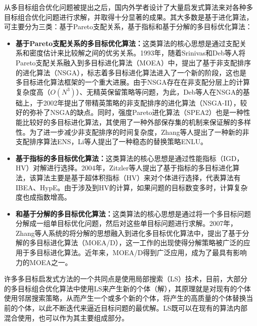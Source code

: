 从多目标组合优化问题被提出之后，国内外学者设计了大量启发式算法来对各种多目标组合优化问题进行求解，并取得十分显著的成果。其大多数是基于进化算法，可主要分为三类：基于Pareto支配关系，基于指标和基于分解的多目标优化算法：
\begin{itemize}
    \item \textbf{基于Pareto支配关系的多目标优化算法：}这类算法的核心思想是通过支配关系和密度估计来比较解之间的优劣关系。1993年，随着Srinivas和Deb等人将Pareto支配关系融入到多目标进化算法（MOEA）中，提出了基于非支配排序的进化算法（NSGA）\cite{srinivas1994muiltiobjective}，标志着多目标进化算法进入了一个新的阶段，这也是多目标进化算法框架的一个重大进展。由于NSGA存在在非支配分层上的计算复杂度高（$O(N^3)$）、无精英保留策略等问题，为此，Deb等人在NSGA的基础上，于2002年提出了带精英策略的非支配排序的进化算法（NSGA-II）\cite{deb2002fast}，较好的弥补了NSGA的缺点。同时，强度Pareto进化算法（SPEA2）\cite{zitzler2001spea2}也是一种性能比较好的多目标进化算法，其使用了一种外部保存集的机制来保证解的多样性。为了进一步减少非支配排序的时间复杂度，Zhang等人提出了一种新的非支配排序算法ENS\cite{zhang2014efficient}，Li等人提出了一种稳态的替换策略ENLU\cite{li2016efficient}。
    \item \textbf{基于指标的多目标优化算法：}这类算法的核心思想是通过性能指标（IGD\cite{bosman2003balance}，HV\cite{zitzler1999multiobjective}）对解进行选择。2004年，Zitzler等人提出了基于指标的多目标进化算法，该算法主要是基于超体积指标（HV）来对个体进行选择，代表算法有IBEA\cite{zitzler2004indicator}、HypE\cite{bader2011hype}。由于涉及到HV的计算，如果问题的目标数变多时，计算复杂度也成指数增高。
    \item \textbf{和基于分解的多目标优化算法：}这类算法的核心思想是通过将一个多目标问题分解成一组单目标优化问题，然后对这些单目标问题进行求解。2007年，Zhang等人系统的将分解的思想融入到进化多目标优化算法中，提出了基于分解的多目标进化算法（MOEA/D）\cite{zhang2007moea}，这一工作的出现使得分解策略被广泛的应用于多目标进化算法。近年来，MOEA/D得到广泛应用，成为了最具有影响力的MOEA之一。
\end{itemize}

许多多目标启发式方法的一个共同点是使用局部搜索（LS）技术，目前，大部分的多目标组合优化算法中使用LS来产生新的个体（解），其原理就是对现有的个体使用邻居搜索策略，从而产生一个或多个新的个体，将产生的高质量的个体替换当前的个体，以此不断迭代来逼近目标问题的最优解。LS既可以在现有的算法内部混合使用，也可以作为其主要组成部分。

